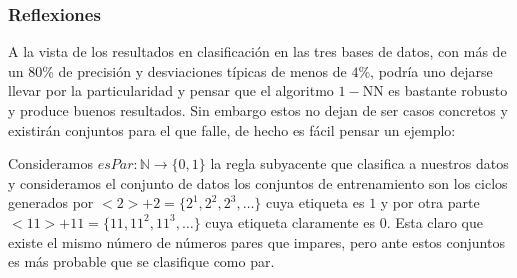 \subsubsection*{Reflexiones}  

A la vista de los resultados en clasificación en las tres bases de datos, con más de un $80\%$ de
 precisión y desviaciones típicas de menos de $4\%$, 
podría uno dejarse llevar por la particularidad y pensar que el algoritmo $1-$NN es bastante robusto 
y produce buenos resultados. Sin embargo estos no dejan de ser casos concretos y existirán conjuntos para el que falle, de hecho es fácil pensar un ejemplo: 

Consideramos $esPar:\mathbb{N} \longrightarrow \{0,1\}$
la regla subyacente que clasifica a nuestros datos y consideramos el conjunto de datos 
los conjuntos de entrenamiento son los ciclos generados por 
$<2>+2 = \{2^1, 2^2, 2^3, \ldots\}$ cuya etiqueta es $1$ y por otra parte
$<11>+11 = \{11, 11^2, 11^3, \ldots\}$ cuya etiqueta claramente es $0$.
Esta claro que existe el mismo número de números pares que impares, pero ante estos conjuntos es más probable que se clasifique como par.



